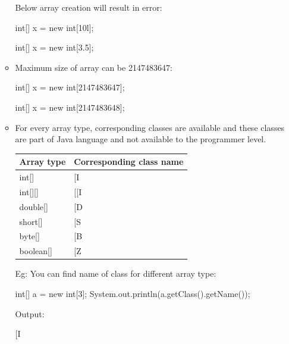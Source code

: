 \begin{flushleft}
\begin{itemize}
\begin{itemize}
			\newpage
			Below array creation will result in error:
			\begin{tcolorbox}[breakable,notitle,boxrule=-0pt,colback=code,colframe=code]
				\color{black}
				\font=8pt
				int[] x = new int[10l]; \xmark \par
				int[] x = new int[3.5]; \xmark 
				\font=4pt
			\end{tcolorbox}
			
			\item Maximum size of array can be 2147483647:
			\begin{tcolorbox}[breakable,notitle,boxrule=-0pt,colback=code,colframe=code]
				\color{black}
				\font=8pt
				int[] x = new int[2147483647]; \cmark \par
				int[] x = new int[2147483648]; \xmark 
				\font=4pt
			\end{tcolorbox}
			
			\item For every array type, corresponding classes are available and these classes are part of Java language and not available to the programmer level.
			\bigskip
			\bigskip
			\begin{tabulary}{1.0\textwidth}{|p{12em}|p{12em}|}
				\toprule
				\textbf{Array type} & \textbf{Corresponding class name} \\
				\midrule
				int[] & [I \\
				\hline
				int[][] & [[I \\
				\hline
				double[] & [D \\
				\hline
				short[] & [S \\
				\hline
				byte[] & [B \\
				\hline
				boolean[] & [Z \\
				\bottomrule
			\end{tabulary}
			\bigskip
			Eg: You can find name of class for different array type:
			\begin{tcolorbox}[breakable,notitle,boxrule=-0pt,colback=code,colframe=code]
				\color{black}
				\font=8pt
				int[] a = new int[3]; \newline
				System.out.println(a.getClass().getName());
				\font=4pt
			\end{tcolorbox}
			
			Output:
			\begin{tcolorbox}[breakable,notitle,boxrule=-0pt,colback=output,colframe=output]
				\color{black}
				\font=8pt
				[I			
				\font=4pt
			\end{tcolorbox}	
			

\end{itemize}
\end{itemize}
\end{flushleft}
